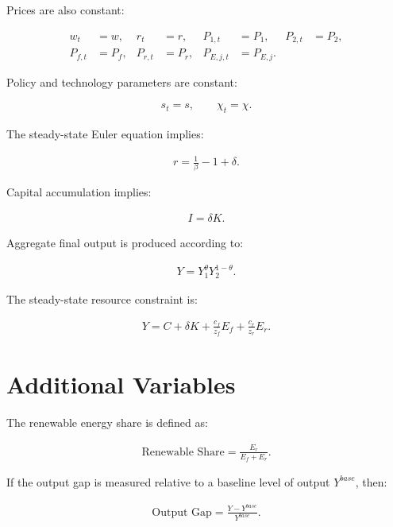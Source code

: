 \documentclass[12pt]{article}
\begin{document}
Prices are also constant:

\begin{align}
w_t &= w,
&
r_t &= r,
&
P_{1,t} &= P_1,
&
P_{2,t} &= P_2,
\\
P_{f,t} &= P_f,
&
P_{r,t} &= P_r,
&
P_{E,j,t} &= P_{E,j}.
\end{align}

Policy and technology parameters are constant:

\begin{align}
s_t = s,
\qquad
\chi_t = \chi.
\end{align}

The steady-state Euler equation implies:

\begin{align}
r
=
\frac{1}{\beta}
-
1
+
\delta.
\end{align}

Capital accumulation implies:

\begin{align}
I
=
\delta K.
\end{align}

Aggregate final output is produced according to:

\begin{align}
Y
=
Y_1^{\theta}
Y_2^{1-\theta}.
\end{align}

The steady-state resource constraint is:

\begin{align}
Y
=
C
+
\delta K
+
\frac{c_f}{z_f}E_f
+
\frac{c_r}{z_r}E_r.
\end{align}

\section{Additional Variables}

The renewable energy share is defined as:

\begin{align}
\text{Renewable Share}
=
\frac{E_r}{E_f+E_r}.
\end{align}

If the output gap is measured relative to a baseline level of output \(Y^{base}\), then:

\begin{align}
\text{Output Gap}
=
\frac{Y-Y^{base}}{Y^{base}}.
\end{align}
\end{document}
